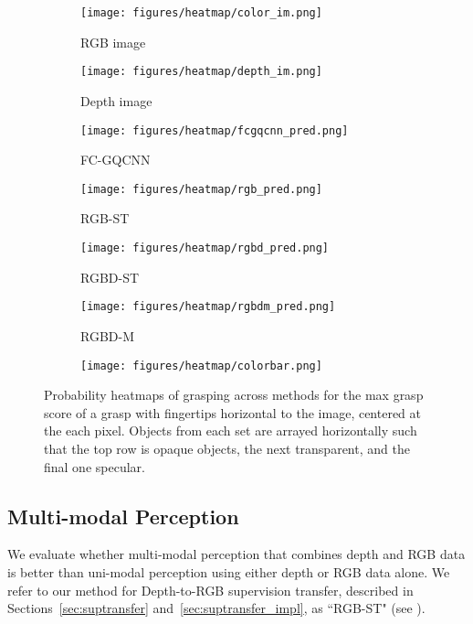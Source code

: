 \begin{figure*}[h]
    \centering
    \begin{subfigure}[b]{0.49\textwidth}
        \centering
        \texttt{[image: figures/heatmap/color\_im.png]}
        \caption*{RGB image}
    \end{subfigure}
    \vspace*{3px}
    \begin{subfigure}[b]{0.49\textwidth}
        \centering
        \texttt{[image: figures/heatmap/depth\_im.png]}
        \caption*{Depth image}
    \end{subfigure}
    \vspace*{1px}
    \begin{subfigure}[b]{0.245\textwidth}
        \centering
        \texttt{[image: figures/heatmap/fcgqcnn\_pred.png]}
        \caption*{FC-GQCNN}
    \end{subfigure}
    \begin{subfigure}[b]{0.245\textwidth}
        \centering
        \texttt{[image: figures/heatmap/rgb\_pred.png]}
        \caption*{RGB-ST}
    \end{subfigure}
    \begin{subfigure}[b]{0.245\textwidth}
        \centering
        \texttt{[image: figures/heatmap/rgbd\_pred.png]}
        \caption*{RGBD-ST}
    \end{subfigure}
    \begin{subfigure}[b]{0.245\textwidth}
        \centering
        \texttt{[image: figures/heatmap/rgbdm\_pred.png]}
        \caption*{RGBD-M}
    \end{subfigure}
    \begin{subfigure}[b]{0.99\textwidth}
        \centering
        \texttt{[image: figures/heatmap/colorbar.png]}
    \end{subfigure}
    \caption{Probability heatmaps of grasping across methods for the max grasp score of a grasp with fingertips horizontal to the image, centered at the each pixel. Objects from each set are arrayed horizontally such that the top row is opaque objects, the next transparent, and the final one specular. }
    \label{fig:heatmap}
    \vspace{-2pt}
\end{figure*}

\subsection{Multi-modal Perception}
\label{sec:multimodal_perception}
We evaluate whether multi-modal perception that combines depth and RGB data is better than uni-modal perception using either depth or RGB data alone.  We refer to our method for Depth-to-RGB supervision transfer, described in Sections~\ref{sec:suptransfer} and~\ref{sec:suptransfer_impl}, as ``RGB-ST" (see ).  

